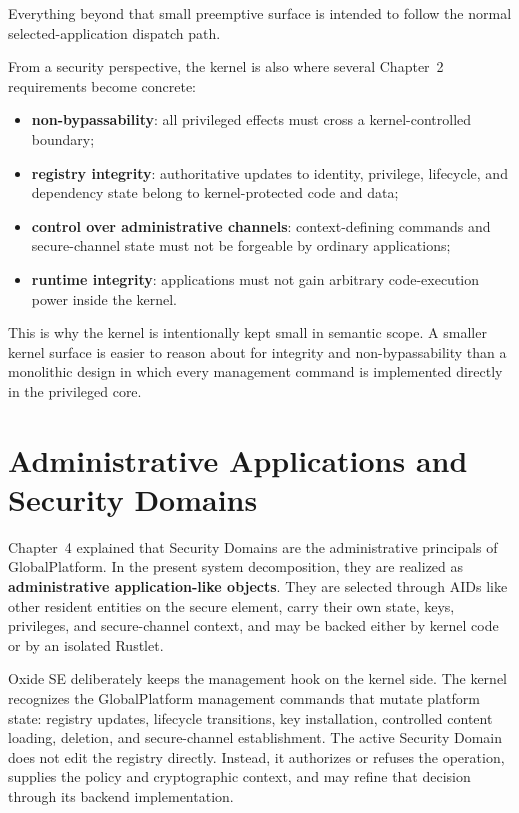 Everything beyond that small preemptive surface is intended to follow the
normal selected-application dispatch path.

From a security perspective, the kernel is also where several Chapter~2
requirements become concrete:
\begin{itemize}
\item \textbf{non-bypassability}: all privileged effects must cross a
  kernel-controlled boundary;
\item \textbf{registry integrity}: authoritative updates to identity,
  privilege, lifecycle, and dependency state belong to kernel-protected
  code and data;
\item \textbf{control over administrative channels}: context-defining
  commands and secure-channel state must not be forgeable by ordinary
  applications;
\item \textbf{runtime integrity}: applications must not gain arbitrary
  code-execution power inside the kernel.
\end{itemize}

This is why the kernel is intentionally kept small in semantic scope. A
smaller kernel surface is easier to reason about for integrity and
non-bypassability than a monolithic design in which every management
command is implemented directly in the privileged core.

\section{Administrative Applications and Security Domains}
\label{sec:system-admin-apps}


Chapter~4 explained that Security Domains are the administrative
principals of GlobalPlatform. In the present system decomposition, they
are realized as \textbf{administrative application-like objects}. They are
selected through AIDs like other resident entities on the secure element, carry
their own state, keys, privileges, and secure-channel context, and may be backed
either by kernel code or by an isolated Rustlet.

Oxide SE deliberately keeps the management hook on the kernel side. The kernel
recognizes the GlobalPlatform management commands that mutate platform state:
registry updates, lifecycle transitions, key installation, controlled content
loading, deletion, and secure-channel establishment. The active Security Domain
does not edit the registry directly. Instead, it authorizes or refuses the
operation, supplies the policy and cryptographic context, and may refine that
decision through its backend implementation.

